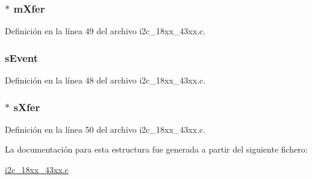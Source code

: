 \subsubsection[{\texorpdfstring{m\+Xfer}{mXfer}}]{$\ast$ m\+Xfer}\hypertarget{structi2c__interface_a98efce62ff892807937d2f94e58c2ab8}{}\label{structi2c__interface_a98efce62ff892807937d2f94e58c2ab8}


Definición en la línea 49 del archivo i2c\+\_\+18xx\+\_\+43xx.\+c.

\subsubsection[{\texorpdfstring{s\+Event}{sEvent}}]{ s\+Event}\hypertarget{structi2c__interface_ad385e4f04cb7955f4b7db77a45e6702c}{}\label{structi2c__interface_ad385e4f04cb7955f4b7db77a45e6702c}


Definición en la línea 48 del archivo i2c\+\_\+18xx\+\_\+43xx.\+c.

\subsubsection[{\texorpdfstring{s\+Xfer}{sXfer}}]{$\ast$ s\+Xfer}\hypertarget{structi2c__interface_ae0980339e9d8a08f1243e3648cab99f2}{}\label{structi2c__interface_ae0980339e9d8a08f1243e3648cab99f2}


Definición en la línea 50 del archivo i2c\+\_\+18xx\+\_\+43xx.\+c.



La documentación para esta estructura fue generada a partir del siguiente fichero\+:\begin{DoxyCompactItemize}
\item 
\hyperlink{i2c__18xx__43xx_8c}{i2c\+\_\+18xx\+\_\+43xx.\+c}\end{DoxyCompactItemize}
